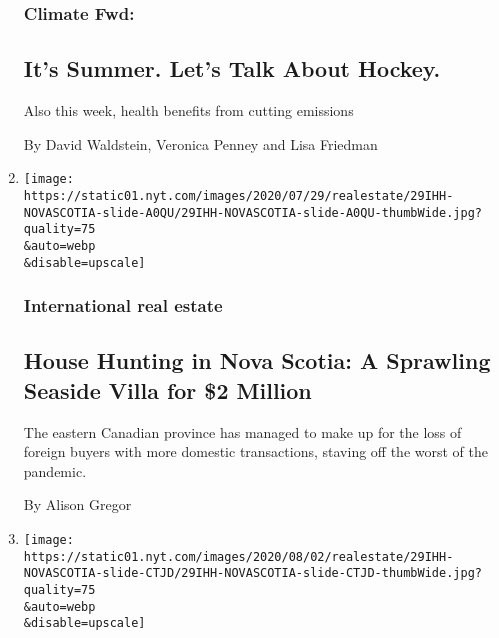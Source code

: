 \begin{enumerate}
  \hypertarget{climate-fwd}{%
  \subsubsection{Climate Fwd:}\label{climate-fwd}}

  \hypertarget{its-summer-lets-talk-about-hockey}{%
  \subsection{It's Summer. Let's Talk About
  Hockey.}\label{its-summer-lets-talk-about-hockey}}

  Also this week, health benefits from cutting emissions

  By David Waldstein, Veronica Penney and Lisa Friedman
\item
  \href{/2020/07/29/realestate/house-hunting-in-nova-scotia-a-sprawling-seaside-villa-for-2-million.html}{}

  \texttt{[image: https://static01.nyt.com/images/2020/07/29/realestate/29IHH-NOVASCOTIA-slide-A0QU/29IHH-NOVASCOTIA-slide-A0QU-thumbWide.jpg?quality=75\\\&auto=webp\\\&disable=upscale]}

  \hypertarget{international-real-estate}{%
  \subsubsection{International real
  estate}\label{international-real-estate}}

  \hypertarget{house-hunting-in-nova-scotia-a-sprawling-seaside-villa-for-2-million}{%
  \subsection{House Hunting in Nova Scotia: A Sprawling Seaside Villa
  for \$2
  Million}\label{house-hunting-in-nova-scotia-a-sprawling-seaside-villa-for-2-million}}

  The eastern Canadian province has managed to make up for the loss of
  foreign buyers with more domestic transactions, staving off the worst
  of the pandemic.

  By Alison Gregor
\item
  \href{/slideshow/2020/07/29/realestate/cape-cod-style-on-the-shores-of-nova-scotia.html}{}

  \texttt{[image: https://static01.nyt.com/images/2020/08/02/realestate/29IHH-NOVASCOTIA-slide-CTJD/29IHH-NOVASCOTIA-slide-CTJD-thumbWide.jpg?quality=75\\\&auto=webp\\\&disable=upscale]}


\end{enumerate}

